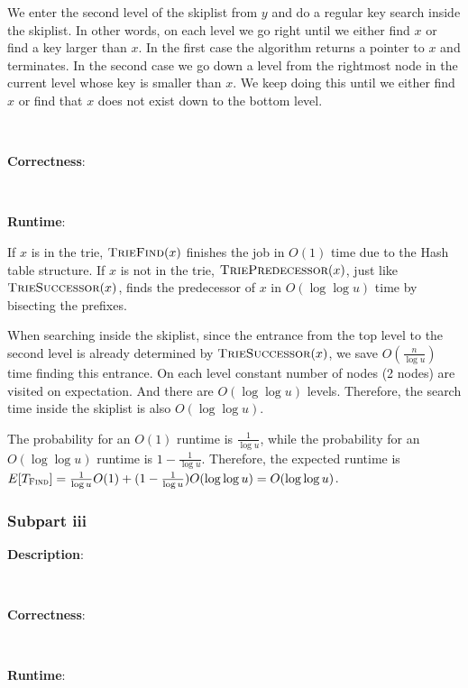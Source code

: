 \documentclass{article}
\begin{document}
We enter the second level of the skiplist from $y$ and do a regular key search inside the skiplist. In other words, on each level we go right until we either find $x$ or find a key larger than $x$. In the first case the algorithm returns a pointer to $x$ and terminates. In the second case we go down a level from the rightmost node in the current level whose key is smaller than $x$. We keep doing this until we either find $x$ or find that $x$ does not exist down to the bottom level.

~

\noindent\textbf{Correctness}:

~

\noindent\textbf{Runtime}:

If $x$ is in the trie, $\textsc{TrieFind}(x)$ finishes the job in $O(1)$ time due to the Hash table structure. If $x$ is not in the trie, $\textsc{TriePredecessor}(x)$, just like $\textsc{TrieSuccessor}(x)$, finds the predecessor of $x$ in $O(\log\log u)$ time by bisecting the prefixes.

When searching inside the skiplist, since the entrance from the top level to the second level is already determined by $\textsc{TrieSuccessor}(x)$, we save $O(\frac{n}{\log u})$ time finding this entrance. On each level constant number of nodes (2 nodes) are visited on expectation. And there are $O(\log\log u)$ levels. Therefore, the search time inside the skiplist is also $O(\log\log u)$.

The probability for an $O(1)$ runtime is $\frac{1}{\log u}$, while the probability for an $O(\log\log u)$ runtime is $1-\frac{1}{\log u}$. Therefore, the expected runtime is $E[T_\textsc{Find}]=\frac{1}{\log u}O(1)+(1-\frac{1}{\log u})O(\log\log u)=O(\log\log u)$.


\subsubsection{Subpart iii}
\noindent\textbf{Description}:

~

\noindent\textbf{Correctness}:

~

\noindent\textbf{Runtime}:
\end{document}
